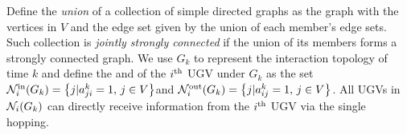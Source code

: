 	Define the \textit{union} of a collection of simple directed graphs 
	as the graph with the vertices in $V$ and the edge set given by the union of each member's edge sets.
	Such collection is \textit{jointly strongly connected} if the union of its members forms a strongly connected graph.
	We use $G_{k}$ to represent the interaction topology of time $k$ and define the \textit{\inbhd} and \textit{\onbhd} of the $i^\text{th}$ UGV under $G_{k}$ as the set \small$\mathcal{N}^\text{in}_i(G_{k})=\left\lbrace j|a^k_{ji}=1,\,j\in V\right\rbrace $\normalsize and  \small$\mathcal{N}^\text{out}_i(G_{k})=\left\lbrace j|a^k_{ij}=1,\,j\in V\right\rbrace $\normalsize. %
	All UGVs in $\mathcal{N}_i(G_{k})$ can directly receive information from the $i^\text{th}$ UGV via the single hopping.
